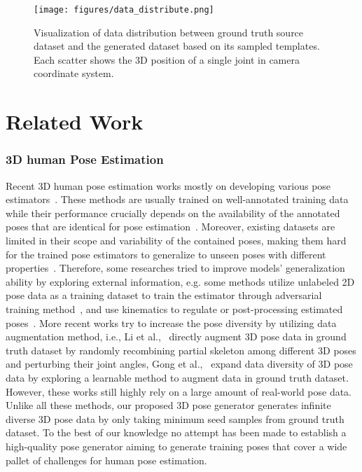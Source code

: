 \documentclass[runningheads]{llncs}
\begin{document}
\begin{figure}[h]
    \centering
    \texttt{[image: figures/data\_distribute.png]}
    \caption{Visualization of data distribution between ground truth source dataset and the generated dataset based on its sampled templates. Each scatter shows the 3D position of a single joint in camera coordinate system.}
    \label{fig:datadistribute}
\end{figure}

\section{Related Work}\label{rework} 
\subsubsection{3D human Pose Estimation} 
Recent 3D human pose estimation works mostly on developing various pose estimators~\cite{mlp,semigcn,videopose,stgcn}. 
These methods are usually trained on well-annotated training data while their performance crucially depends on the availability of the annotated poses that are identical for pose estimation~\cite{survey}. 
Moreover, existing datasets are limited in their scope and variability of the contained poses, making them hard for the trained pose estimators to generalize to unseen poses with different properties~\cite{post1,aug1,poseaug}.
Therefore, some researches tried to improve models’ generalization ability by exploring external information, e.g. some methods utilize unlabeled 2D pose data as a training dataset to train the estimator through adversarial training method~\cite{adver1,adver2}, and use kinematics to regulate or post-processing estimated poses~\cite{post1,post2,post3}. 
More recent works try to increase the pose diversity by utilizing data augmentation method, i.e., Li et al.,~\cite{aug1} directly augment 3D pose data in ground truth dataset by randomly recombining partial skeleton among different 3D poses and perturbing their joint angles, Gong et al.,~\cite{poseaug} expand data diversity of 3D pose data by exploring a learnable method to augment data in ground truth dataset. 
However, these works still highly rely on a large amount of real-world pose data. Unlike all these methods, our proposed 3D pose generator generates infinite diverse 3D pose data by only taking minimum seed samples from ground truth dataset.
To the best of our knowledge no attempt has been made to establish a high-quality pose generator aiming to generate training poses that cover a wide pallet of challenges for human pose estimation.
\end{document}
